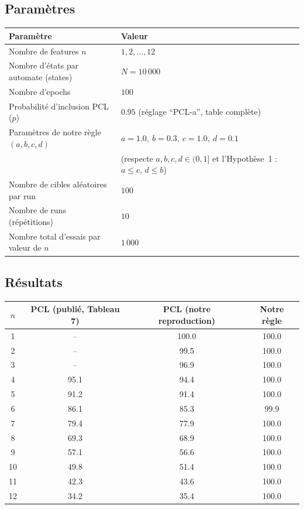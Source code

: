 \documentclass[11pt]{article}
\begin{document}
\subsection{Paramètres}

\begin{center}
\begin{tabular}{ll}
\toprule
Paramètre & Valeur \\
\midrule
Nombre de features $n$ & $1,2,\ldots,12$ \\
Nombre d'états par automate (states) & $N=10\,000$ \\
Nombre d'epochs & $100$ \\
Probabilité d'inclusion PCL ($p$) & $0.95$ (réglage ``PCL-a'', table complète) \\
Paramètres de notre règle $(a,b,c,d)$ & $a=1.0,\ b=0.3,\ c=1.0,\ d=0.1$ \\
& (respecte $a,b,c,d\in(0,1]$ et l'Hypothèse~1 : $a\le c$, $d\le b$) \\
Nombre de cibles aléatoires par run & $100$ \\
Nombre de runs (répétitions) & $10$ \\
Nombre total d'essais par valeur de $n$ & $1\,000$ \\
\bottomrule
\end{tabular}
\end{center}

\subsection{Résultats}

\begin{center}
\begin{tabular}{cccc}
\toprule
$n$ & PCL (publié, Tableau 7) & PCL (notre reproduction) & Notre règle \\
\midrule
1  & --    & 100.0 & 100.0 \\
2  & --    & 99.5  & 100.0 \\
3  & --    & 96.9  & 100.0 \\
4  & 95.1  & 94.4  & 100.0 \\
5  & 91.2  & 91.4  & 100.0 \\
6  & 86.1  & 85.3  & 99.9  \\
7  & 79.4  & 77.9  & 100.0 \\
8  & 69.3  & 68.9  & 100.0 \\
9  & 57.1  & 56.6  & 100.0 \\
10 & 49.8  & 51.4  & 100.0 \\
11 & 42.3  & 43.6  & 100.0 \\
12 & 34.2  & 35.4  & 100.0 \\
\bottomrule
\end{tabular}
\end{center}
\end{document}

